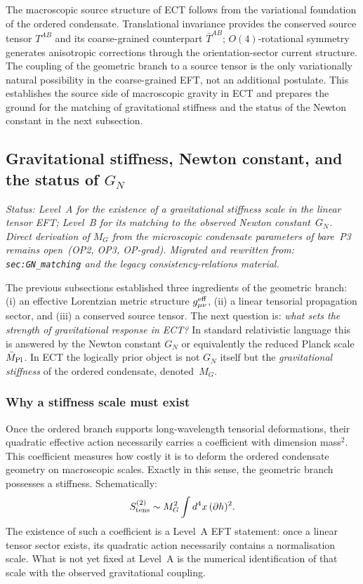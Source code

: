 \documentclass[11pt,a4paper]{article}
\numberwithin{equation}{section}
\begin{document}
The macroscopic source structure of ECT follows from the variational
foundation of the ordered condensate.
Translational invariance provides the conserved source tensor
$T^{AB}$ and its coarse-grained counterpart $\bar{T}^{AB}$;
$O(4)$-rotational symmetry generates anisotropic corrections through
the orientation-sector current structure.
The coupling of the geometric branch to a source tensor is the only
variationally natural possibility in the coarse-grained EFT, not an
additional postulate.
This establishes the source side of macroscopic gravity in ECT and
prepares the ground for the matching of gravitational stiffness and
the status of the Newton constant in the next subsection.


\subsection{Gravitational stiffness, Newton constant,
and the status of $G_N$}
\label{sec:mp_matching}

\textit{Status: Level~A for the existence of a gravitational stiffness
scale in the linear tensor EFT; Level~B for its matching to the observed
Newton constant~$G_N$. Direct derivation of $M_G$ from the microscopic
condensate parameters of bare~P3 remains open~(OP2, OP3, OP-grad).
Migrated and rewritten from: \texttt{sec:GN\_matching} and the legacy
consistency-relations material.}

\medskip
The previous subsections established three ingredients of the geometric
branch: (i) an effective Lorentzian metric structure $g^{\rm eff}_{\mu\nu}$,
(ii) a linear tensorial propagation sector, and (iii) a conserved source
tensor.
The next question is: \emph{what sets the strength of gravitational
response in ECT?}
In standard relativistic language this is answered by the Newton constant
$G_N$ or equivalently the reduced Planck scale $\bar M_{\rm Pl}$.
In ECT the logically prior object is not $G_N$ itself but the
\emph{gravitational stiffness} of the ordered condensate, denoted~$M_G$.

\subsubsection*{Why a stiffness scale must exist}

Once the ordered branch supports long-wavelength tensorial deformations,
their quadratic effective action necessarily carries a coefficient with
dimension mass$^2$.
This coefficient measures how costly it is to deform the ordered
condensate geometry on macroscopic scales.
Exactly in this sense, the geometric branch possesses a stiffness.
Schematically:
\begin{equation}
  \label{eq:grav_stiffness_schematic}
  S_{\rm tens}^{(2)}
  \sim
  M_G^2 \int d^4x\,(\partial h)^2.
\end{equation}
The existence of such a coefficient is a Level~A EFT statement:
once a linear tensor sector exists, its quadratic action necessarily
contains a normalisation scale.
What is not yet fixed at Level~A is the numerical identification
of that scale with the observed gravitational coupling.
\end{document}
